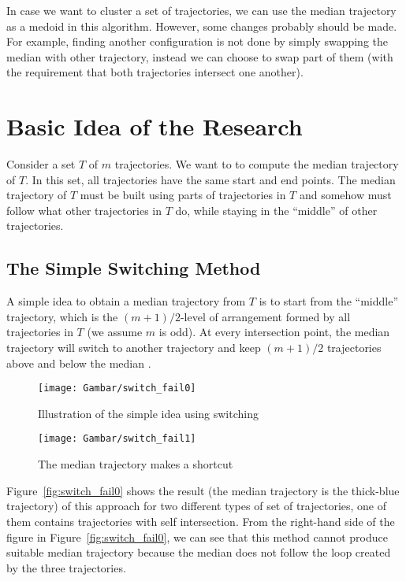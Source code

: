 In case we want to cluster a set of trajectories, we can use the median trajectory as a medoid in this algorithm.
However, some changes probably should be made.
For example, finding another configuration is not done by simply swapping the median with other trajectory, instead we can choose to swap part of them (with the requirement that both trajectories intersect one another).

\section{Basic Idea of the Research}

Consider a set $T$ of $m$ trajectories.
We want to to compute the median trajectory of $T$.
In this set, all trajectories have the same start and end points.
The median trajectory of $T$ must be built using parts of trajectories in $T$ and somehow must follow what other trajectories in $T$ do, while staying in the ``middle'' of other trajectories.

\subsection{The Simple Switching Method }

A simple idea to obtain a median trajectory from $T$ is to start from the ``middle'' trajectory, which is the $(m+1)/2$-level of arrangement formed by all trajectories in $T$ (we assume $m$ is odd).
At every intersection point, the median trajectory will switch to another trajectory and keep $(m+1)/2$ trajectories above and below the median \cite{Buchin:2010}.

\begin{figure}
\centering
\texttt{[image: Gambar/switch\_fail0]}
\caption[Illustration of the simple idea using switching]{Illustration of the simple idea using switching} 
\end{figure}

\begin{figure}
\centering
\texttt{[image: Gambar/switch\_fail1]}
\caption[The median trajectory make a shortcut path \cite{Lionov:2009}]{The median trajectory makes a shortcut \cite{Lionov:2009}} 
\end{figure} 

Figure~\ref{fig:switch_fail0} shows the result (the median trajectory is the thick-blue trajectory) of this approach for two different types of set of trajectories, one of them contains trajectories with self intersection.
From the right-hand side of the figure in Figure~\ref{fig:switch_fail0}, we can see that this method cannot produce suitable median trajectory because the median does not follow the loop created by the three trajectories.

